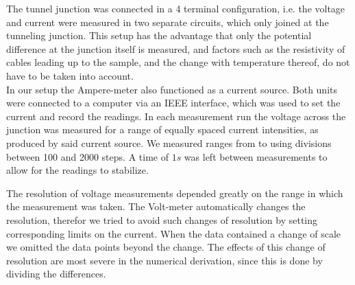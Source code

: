 
The tunnel junction was connected in a 4 terminal configuration, i.e. the voltage and current were measured in two separate circuits, which only joined at the tunneling junction. This setup has the advantage that only the potential difference at the junction itself is measured, and factors such as the resistivity of cables leading up to the sample, and the change with temperature thereof, do not have to be taken into account. \\

In our setup the Ampere-meter also functioned as a current source. Both units were connected to a computer via an IEEE interface, which was used to set the current and record the readings. In each measurement run the voltage across the junction was measured for a range of equally spaced current intensities, as produced by said current source.  We measured ranges from to using divisions between 100 and 2000 steps. A time of $1s$ was left between measurements to allow for the readings to stabilize.

The resolution of voltage measurements depended greatly on the range in which the measurement was taken. The Volt-meter automatically changes the resolution, therefor we tried to avoid such changes of resolution by setting corresponding limits on the current. When the data contained a change of scale we omitted the data points beyond the change. The effects of this change of resolution are most severe in the numerical derivation, since this is done by dividing the differences.






